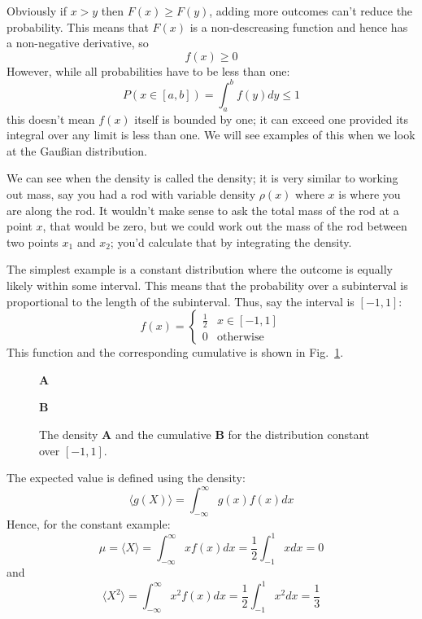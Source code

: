 \documentclass[11pt,a4paper]{scrartcl}
\begin{document}
Obviously if $x>y$ then $F(x)\ge F(y)$, adding more outcomes can't reduce the probability. This means that $F(x)$ is a non-descreasing function and hence has a non-negative derivative, so
\begin{equation}
  f(x)\ge 0
\end{equation}
However, while all probabilities have to be less than one:
\begin{equation}
  P(x\in [a,b])=\int_a^bf(y)dy\le 1
\end{equation}
this doesn't mean $f(x)$ itself is bounded by one; it can exceed one
provided its integral over any limit is less than one. We will see
examples of this when we look at the Gau\ss ian distribution.

We can see when the density is called the density; it is very similar
to working out mass, say you had a rod with variable density $\rho(x)$
where $x$ is where you are along the rod. It wouldn't make sense to
ask the total mass of the rod at a point $x$, that would be zero, but
we could work out the mass of the rod between two points $x_1$ and
$x_2$; you'd calculate that by integrating the density.

The simplest example is a constant distribution where the outcome is
equally likely within some interval. This means that the probability
over a subinterval is proportional to the length of the
subinterval. Thus, say the interval is $[-1,1]$:
\begin{equation}
f(x)=\left\{\begin{array}{ll}\frac{1}{2}&x\in [-1,1]\\0&\mbox{otherwise}\end{array}\right.
\end{equation}
This function and the corresponding cumulative is shown in Fig.~\ref{fig_const}.

\begin{figure}
\textbf{A}
\begin{center}

\end{center}
\textbf{B}
\begin{center}

\end{center}
\caption{The density \textbf{A} and the cumulative \textbf{B} for the distribution constant over $[-1,1]$.\label{fig_const}}
\end{figure}

The expected value is defined using the density:
\begin{equation}
\langle g(X)\rangle =\int_{-\infty}^\infty g(x)f(x)dx
\end{equation}
Hence, for the constant example:
\begin{equation}
\mu=\langle X\rangle=\int_{-\infty}^\infty xf(x)dx=\frac{1}{2}\int_{-1}^1xdx=0
\end{equation}
and
\begin{equation}
\langle X^2\rangle=\int_{-\infty}^\infty x^2f(x)dx=\frac{1}{2}\int_{-1}^1x^2dx=\frac{1}{3}
\end{equation}
\end{document}

